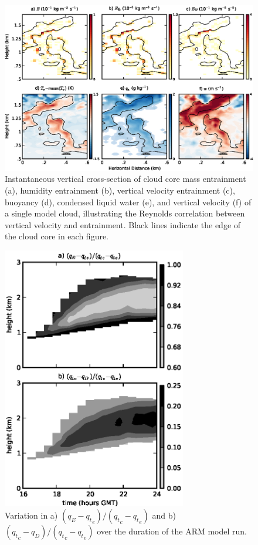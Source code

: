 \documentclass[12pt]{article}
\begin{document}
\begin{figure}[t]
  \noindent\includegraphics[width=39pc]{./figures/w_entrainment_example}
  \caption{Instantaneous vertical cross-section of cloud core mass entrainment 
  (a), humidity entrainment (b), vertical velocity entrainment (c), buoyancy 
  (d), condensed liquid water (e), and vertical velocity (f) of a single model
  cloud, illustrating the Reynolds correlation between vertical velocity and 
  entrainment.  Black lines indicate the edge of the cloud core in each figure.}
  \label{fig:w_entrainment_example}
\end{figure}


\begin{figure}[t]
  \noindent\includegraphics[width=19pc]{./figures/shell_variability}
  \caption{Variation in a) $(q_E - {q_t}_e)/({q_t}_c - {q_t}_e)$ and b)
  $({q_t}_c - q_D)/({q_t}_c - {q_t}_e)$ over the duration of the ARM model run.
  }
  \label{fig:shell_variability}
\end{figure}
\end{document}
